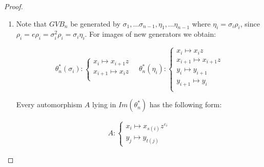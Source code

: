 \documentclass{article}
\begin{document}
\begin{proof}

\begin{enumerate}

\item Note that $GVB_n$ be generated by $\sigma_1, \ldots \sigma_{n-1}, \eta_1, \ldots \eta_{n-1}$ where $\eta_i=\sigma_i\rho_i$, since $\rho_i=e\rho_i=\sigma_i^2\rho_i=\sigma_i\eta_i$. For images of new generators we obtain:



\begin{equation}\label{newdef}

\theta_n^*(\sigma_i):

\begin{cases}

x_i \mapsto x_{i+1}z\\

x_{i+1} \mapsto x_iz\\

\end{cases}\quad

\theta_n^*(\eta_i):

\begin{cases}

x_i \mapsto x_{i}z\\

x_{i+1} \mapsto x_{i+1}z\\

y_i \mapsto y_{i+1}\\

y_{i+1} \mapsto y_i\\

\end{cases}

\end{equation}



Every automorphism $A$ lying in $Im(\theta_n^*)$ has the following form:



\begin{align*}

A:

\begin{cases}

x_i\mapsto x_{s(i)}z^{\varepsilon_i}\\

y_j\mapsto y_{t(j)}

\end{cases}

\end{align*}




\end{enumerate}
\end{proof}
\end{document}
